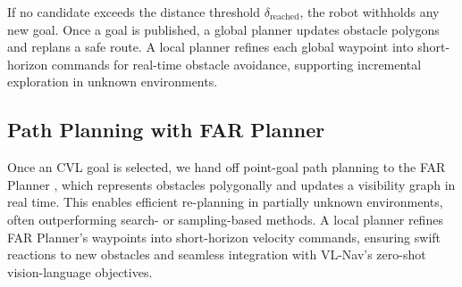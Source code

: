 If no candidate exceeds the distance threshold $\delta_{\mathrm{reached}}$, the robot withholds any new goal. Once a goal is published, a global planner updates obstacle polygons and replans a safe route. A local planner refines each global waypoint into short-horizon commands for real-time obstacle avoidance, supporting incremental exploration in unknown environments.



\subsection{Path Planning with FAR Planner}
Once an CVL goal is selected, we hand off point-goal path planning to the FAR Planner \cite{yang2022far}, which represents obstacles polygonally and updates a visibility graph in real time. This enables efficient re-planning in partially unknown environments, often outperforming search- or sampling-based methods. A local planner refines FAR Planner’s waypoints into short-horizon velocity commands, ensuring swift reactions to new obstacles and seamless integration with VL-Nav’s zero-shot vision-language objectives.



